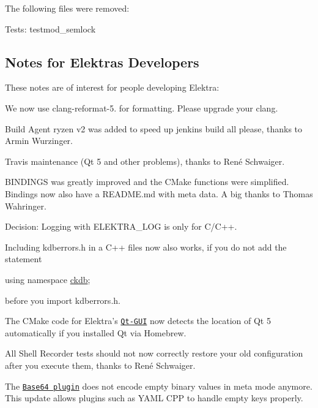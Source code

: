 The following files were removed\+:


\begin{DoxyItemize}
\item Tests\+: {\ttfamily testmod\+\_\+semlock}
\end{DoxyItemize}

\subsection*{Notes for Elektra\textquotesingle{}s Developers}

These notes are of interest for people developing Elektra\+:


\begin{DoxyItemize}
\item We now use {\ttfamily clang-\/reformat-\/5.} for formatting. Please upgrade your clang.
\item Build Agent {\ttfamily ryzen v2} was added to speed up {\ttfamily jenkins build all please}, thanks to Armin Wurzinger.
\item Travis maintenance (Qt 5 and other problems), thanks to René Schwaiger.
\item {\ttfamily B\+I\+N\+D\+I\+N\+GS} was greatly improved and the C\+Make functions were simplified. Bindings now also have a {\ttfamily R\+E\+A\+D\+M\+E.\+md} with meta data. A big thanks to Thomas Wahringer.
\item Decision\+: Logging with {\ttfamily E\+L\+E\+K\+T\+R\+A\+\_\+\+L\+OG} is only for C/\+C++.
\item Including {\ttfamily kdberrors.\+h} in a C++ files now also works, if you do not add the statement
\end{DoxyItemize}


\begin{DoxyCode}
\textcolor{keyword}{using namespace }\hyperlink{namespaceckdb}{ckdb};
\end{DoxyCode}


before you import {\ttfamily kdberrors.\+h}.


\begin{DoxyItemize}
\item The C\+Make code for Elektra’s \href{https://www.libelektra.org/tools/qt-gui}{\tt Qt-\/\+G\+UI} now detects the location of Qt 5 automatically if you installed Qt via Homebrew.
\item All Shell Recorder tests should not now correctly restore your old configuration after you execute them, thanks to René Schwaiger.
\item The \href{https://www.libelektra.org/plugins/base64}{\tt Base64 plugin} does not encode empty binary values in meta mode anymore. This update allows plugins such as Y\+A\+ML C\+PP to handle empty keys properly.
\end{DoxyItemize}

